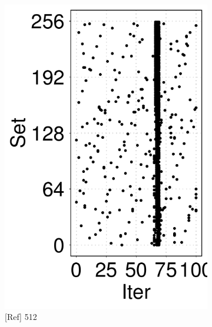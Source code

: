 \begin{figure}[t]
\begin{subfigure}[b]{.24\linewidth}
        \includegraphics[width=\linewidth]{figure/plot/reference/fig14-pmdk-kv-memory-pattern-512.tikz.pdf}
        \caption{[Ref] 512}
        \label{fig:14:ref:pmdk-kv-memory-pattern2}
    \end{subfigure}
    \hfill
    \begin{subfigure}[b]{.24\linewidth}
        \centering

\end{subfigure}
\end{figure}
